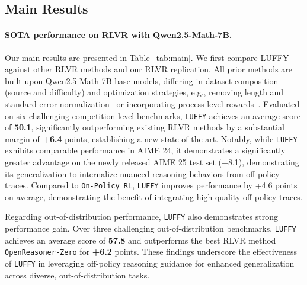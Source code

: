 \documentclass{article}
\newcommand{\m}[1]{\texttt{#1}}
\begin{document}
\subsection{Main Results}
\label{sec:main}
\paragraph{SOTA performance on RLVR with Qwen2.5-Math-7B.}
Our main results are presented in Table~\ref{tab:main}. We first compare LUFFY against other RLVR methods and our RLVR replication. 
All prior methods are built upon Qwen2.5-Math-7B base models, differing in dataset composition (source and difficulty) and optimization strategies, e.g., removing length and standard error normalization~\cite{drgrpo} or incorporating process-level rewards~\cite{prime}.
Evaluated on six challenging competition-level benchmarks, \m{LUFFY} achieves an average score of \textbf{50.1}, significantly outperforming existing RLVR methods by a substantial margin of \textbf{+6.4} points, establishing a new state-of-the-art. 
Notably, while \m{LUFFY} exhibits comparable performance in AIME 24, it demonstrates a significantly greater advantage on the newly released AIME 25 test set (+8.1), demonstrating its generalization to internalize nuanced reasoning behaviors from off-policy traces. 
Compared to \m{On-Policy RL}, \m{LUFFY} improves performance by +4.6 points on average, demonstrating the benefit of integrating high-quality off-policy traces.

Regarding out-of-distribution performance, \m{LUFFY} also demonstrates strong performance gain. Over three challenging out-of-distribution benchmarks, \m{LUFFY} achieves an average score of \textbf{57.8} and outperforms the best RLVR method \m{OpenReasoner-Zero} for \textbf{+6.2} points. These findings underscore the effectiveness of \m{LUFFY} in leveraging off-policy reasoning guidance for enhanced generalization across diverse, out-of-distribution tasks.
\end{document}
